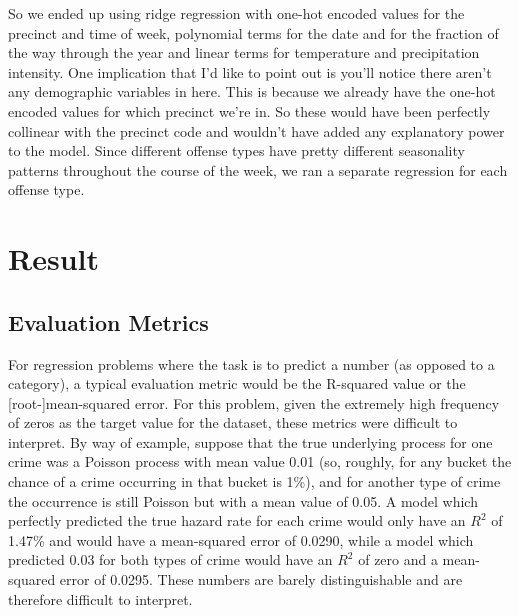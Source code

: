 \documentclass[10pt,journal,compsoc]{IEEEtran}
\begin{document}
So we ended up using ridge regression with one-hot encoded values for the precinct and time of week, polynomial terms for the date and for the fraction of the way through the year and linear terms for temperature and precipitation intensity. One implication that I'd like to point out is you'll notice there aren't any demographic variables in here. This is because we already have the one-hot encoded values for which precinct we're in. So these would have been perfectly collinear with the precinct code and wouldn't have added any explanatory power to the model. Since different offense types have pretty different seasonality patterns throughout the course of the week, we ran a separate regression for each offense type.


\section{Result}

\subsection{Evaluation Metrics}

For regression problems where the task is to predict a number (as opposed to a
category), a typical evaluation metric would be the R-squared value or the
[root-]mean-squared error. For this problem, given the extremely high frequency of
zeros as the target value for the dataset, these metrics were difficult to interpret. By way of example, suppose that the true underlying process for one crime was a Poisson
process with mean value 0.01 (so, roughly, for any bucket the chance of a crime
occurring in that bucket is 1\%), and for another type of crime the occurrence is still
Poisson but with a mean value of 0.05. A model which perfectly predicted the true
hazard rate for each crime would only have an $R^2$ of 1.47\% and would have a
mean-squared error of 0.0290, while a model which predicted 0.03 for both types of
crime would have an $R^2$ of zero and a mean-squared error of 0.0295. These numbers
are barely distinguishable and are therefore difficult to interpret.\\
\end{document}
